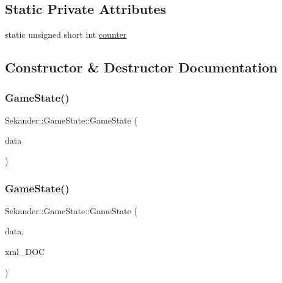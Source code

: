 \subsection*{Static Private Attributes}
\begin{DoxyCompactItemize}
\item 
static unsigned short int \hyperlink{classSekander_1_1GameState_af70f88a071cda53e0a020a4d2d21dbd3}{counter}
\end{DoxyCompactItemize}


\subsection{Constructor \& Destructor Documentation}
\mbox{\label{classSekander_1_1GameState_af47a4f5c384bf320048bea9b95b854ea}} 
\subsubsection{\texorpdfstring{Game\+State()}{GameState()}\hspace{0.1cm}{\footnotesize\ttfamily [1/6]}}
{\footnotesize\ttfamily Sekander\+::\+Game\+State\+::\+Game\+State (\begin{DoxyParamCaption}\item[{\hyperlink{namespaceSekander_a1d69b002ba2d23020901c28f0def5e16}{Game\+Data\+Ref}}]{data }\end{DoxyParamCaption})}

\mbox{\label{classSekander_1_1GameState_a6003e8f7b7ed16e9cd005972c1738714}} 
\subsubsection{\texorpdfstring{Game\+State()}{GameState()}\hspace{0.1cm}{\footnotesize\ttfamily [2/6]}}
{\footnotesize\ttfamily Sekander\+::\+Game\+State\+::\+Game\+State (\begin{DoxyParamCaption}\item[{\hyperlink{namespaceSekander_a1d69b002ba2d23020901c28f0def5e16}{Game\+Data\+Ref}}]{data,  }\item[{const char $\ast$}]{xml\+\_\+\+D\+OC }\end{DoxyParamCaption})}


